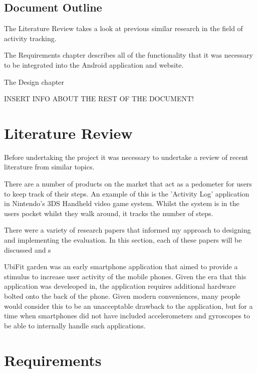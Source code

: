 \documentclass{l4proj}
\begin{document}
\section{Document Outline}

The Literature Review takes a look at previous similar research in the field of activity tracking.

The Requirements chapter describes all of the functionality that it was necessary to be integrated into the Android application and website.

The Design chapter 

INSERT INFO ABOUT THE REST OF THE DOCUMENT!


\chapter{Literature Review}

Before undertaking the project it was necessary to undertake a review of recent literature from similar topics.

There are a number of products on the market that act as a pedometer for users to keep track of their steps. An example of this is the 'Activity Log' application in Nintendo's 3DS Handheld video game system. Whilst the system is in the users pocket whilst they walk around, it tracks the number of steps.

There were a variety of research papers that informed my approach to designing and implementing the evaluation. In this section, each of these papers will be discussed and s 

UbiFit garden was an early smartphone application that aimed to provide a stimulus to increase user activity of the mobile phones. Given the era that this application was develeoped in, the application requires additional hardware bolted onto the back of the phone. Given modern conveniences, many people would consider this to be an unacceptable drawback to the application, but for a time when smartphones did not have included accelerometers and gyroscopes to be able to internally handle such applications.


\chapter{Requirements}
\end{document}
